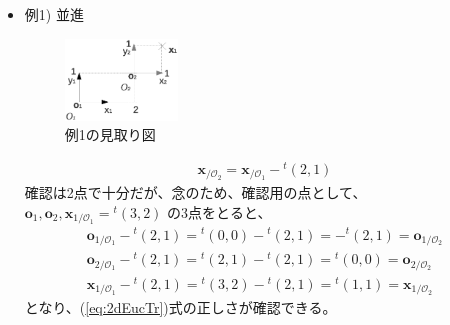 \documentclass[10pt]{jarticle}
\begin{document}
\begin{itemize}
\item 例1) 並進
  \begin{figure}[htb]
    \centering
    \includegraphics[width=3cm]{ex1.eps}
    \caption{例1の見取り図}
    \label{fig:ex1}
  \end{figure}
\begin{eqnarray}
\boldsymbol{x}_{/\mathcal{O}_2} = \boldsymbol x_{/\mathcal O_1} - {}^t(2,1)
\end{eqnarray}
確認は2点で十分だが、念のため、確認用の点として、
$\boldsymbol{o}_1, \boldsymbol{o}_2, \boldsymbol{x}_{1/\mathcal O_1}= {}^t(3,2)$
の3点をとると、
\begin{eqnarray}
\boldsymbol{o}_{1/\mathcal O_1} - {}^t(2,1) = {}^t(0,0)-{}^t(2,1) = -{}^t(2,1) = \boldsymbol{o}_{1/\mathcal{O}_2} \nonumber\\
\boldsymbol{o}_{2/\mathcal O_1} - {}^t(2,1) = {}^t(2,1)-{}^t(2,1) = {}^t(0,0) = \boldsymbol{o}_{2/\mathcal{O}_2} \nonumber\\
\boldsymbol{x}_{1/\mathcal O_1} - {}^t(2,1) = {}^t(3,2)-{}^t(2,1) = {}^t(1,1) = \boldsymbol{x}_{1/\mathcal{O}_2} \nonumber
\end{eqnarray}
となり、(\ref{eq:2dEucTr})式の正しさが確認できる。


\end{itemize}
\end{document}
